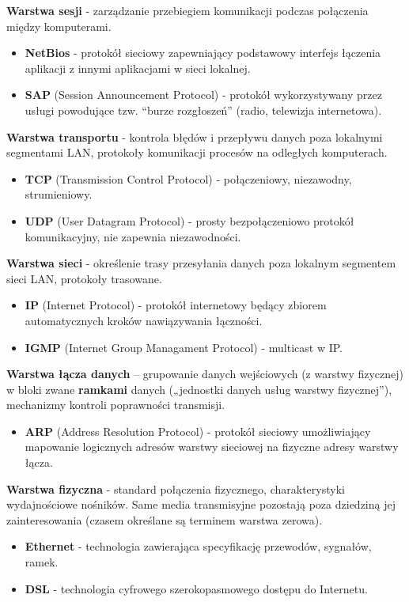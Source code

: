 \documentclass[main.tex]{subfiles}
\begin{document}
    \noindent \textbf{Warstwa sesji} - zarządzanie przebiegiem komunikacji podczas
    połączenia między komputerami.
    \begin{itemize}[noitemsep]
        \item \textbf{NetBios} - protokół sieciowy zapewniający podstawowy interfejs
        łączenia aplikacji z innymi aplikacjami w sieci lokalnej.
        \item \textbf{SAP} (Session Announcement Protocol) - protokół wykorzystywany przez usługi powodujące tzw.
        ``burze rozgłoszeń'' (radio, telewizja internetowa).
    \end{itemize}

    \noindent \textbf{Warstwa transportu} - kontrola błędów i przepływu danych
    poza lokalnymi segmentami LAN, protokoły komunikacji procesów na odległych komputerach.
    \begin{itemize}[noitemsep]
        \item \textbf{TCP} (Transmission Control Protocol) - połączeniowy, niezawodny, strumieniowy.
        \item \textbf{UDP} (User Datagram Protocol) - prosty bezpołączeniowo protokół komunikacyjny, nie zapewnia
        niezawodności.
    \end{itemize}

    \noindent \textbf{Warstwa sieci} - określenie trasy przesyłania danych poza lokalnym segmentem sieci LAN,
    protokoły trasowane.
    \begin{itemize}[noitemsep]
        \item \textbf{IP} (Internet Protocol) - protokół internetowy będący zbiorem automatycznych kroków
        nawiązywania łączności.
        \item \textbf{IGMP} (Internet Group Managament Protocol) - multicast w IP.
    \end{itemize}

    \noindent \textbf{Warstwa łącza danych} – grupowanie danych wejściowych (z warstwy fizycznej) w bloki zwane
    \textbf{ramkami} danych („jednostki danych usług warstwy fizycznej”), mechanizmy kontroli poprawności
    transmisji.
    \begin{itemize}[noitemsep]
        \item \textbf{ARP} (Address Resolution Protocol) - protokół sieciowy umożliwiający mapowanie logicznych
        adresów warstwy sieciowej na fizyczne adresy warstwy łącza.
    \end{itemize}

    \noindent \textbf{Warstwa fizyczna} - standard połączenia fizycznego, charakterystyki wydajnościowe nośników.
    Same media transmisyjne pozostają poza dziedziną jej zainteresowania (czasem określane są terminem warstwa zerowa).
    \begin{itemize}[noitemsep]
        \item \textbf{Ethernet} - technologia zawierająca specyfikację przewodów, sygnałów, ramek.
        \item \textbf{DSL} - technologia cyfrowego szerokopasmowego dostępu do Internetu.
    \end{itemize}
\end{document}
